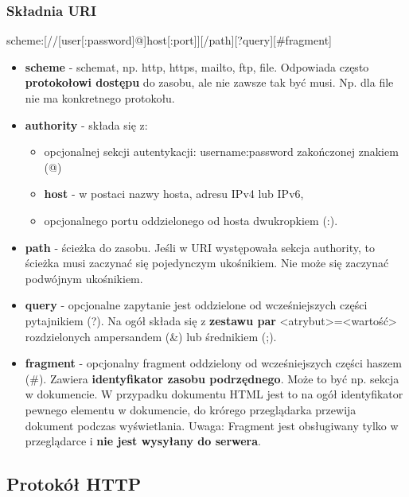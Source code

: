 \documentclass[../main.tex]{subfiles}
\begin{document}
    \subsubsection{Składnia URI}
    \begin{lcverbatim}
        scheme:[//[user[:password]@]host[:port]][/path][?query][#fragment]
    \end{lcverbatim}
    \begin{itemize}
        \item \textbf{scheme} - schemat, np. http, https, mailto, ftp, file. Odpowiada często \textbf{protokołowi dostępu} do zasobu, ale nie zawsze tak być musi. Np. dla file nie ma konkretnego protokołu.
        \item \textbf{authority} - składa się z:
        \begin{itemize}
            \item opcjonalnej sekcji autentykacji: username:password zakończonej znakiem (@)
            \item \textbf{host} - w postaci nazwy hosta, adresu IPv4 lub IPv6,
            \item opcjonalnego portu oddzielonego od hosta dwukropkiem (:).
        \end{itemize}
        \item \textbf{path} - ścieżka do zasobu. Jeśli w URI występowała sekcja authority, to ścieżka musi zaczynać się pojedynczym ukośnikiem. Nie może się zaczynać podwójnym ukośnikiem.
        \item \textbf{query} - opcjonalne zapytanie jest oddzielone od wcześniejszych części pytajnikiem (?). Na ogół składa się z \textbf{zestawu par} <atrybut>=<wartość> rozdzielonych ampersandem (\&) lub średnikiem (;).
        \item \textbf{fragment} - opcjonalny fragment oddzielony od wcześniejszych części haszem (\#). Zawiera \textbf{identyfikator zasobu podrzędnego}. Może to być np. sekcja w dokumencie. W przypadku dokumentu HTML jest to na ogół identyfikator pewnego elementu w dokumencie, do krórego przeglądarka przewija dokument podczas wyświetlania.
        Uwaga: Fragment jest obsługiwany tylko w przeglądarce i \textbf{nie jest wysyłany do serwera}.
    \end{itemize}

    \subsection{Protokół HTTP}
\end{document}
